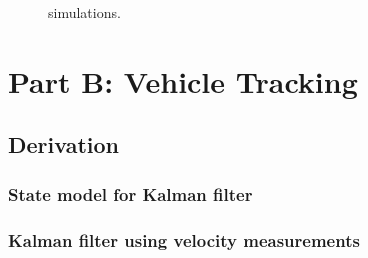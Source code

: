 \documentclass[11pt]{article}
\begin{document}
\begin{figure}[h]
\caption{simulations.}
\label{fig:ROCdexit}
\end{figure}


\section{Part B: Vehicle Tracking}
\label{sec:partA_Tracking}


\subsection{Derivation}
\label{subsec:partB_derivation}


\subsubsection{State model for Kalman filter}
\label{subsubsec:stateModel}


\subsubsection{Kalman filter using velocity measurements}
\label{subsubsec:velocityKalmanFilter}
\end{document}
